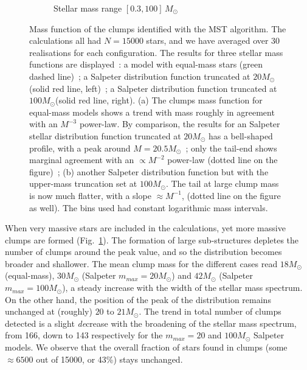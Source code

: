 \begin{figure}
\begin{subfigure}[b]{0.49\textwidth}
        \caption{Stellar mass range $[0.3, 100]\, M_\odot$}
        \label{Fig:2_ClumpMF_MF_2}
    \end{subfigure}
\caption{Mass function of the clumps identified with the MST algorithm. The calculations all had $N = 15 000$ stars, and we have averaged over 30 realisations for each configuration.  The results for three stellar mass functions  are displayed~: a model with equal-mass stars (green dashed line)~; a Salpeter distribution function truncated at $20 M_\odot$ (solid red line, left)~; a Salpeter distribution function truncated at $100 M_\odot$(solid red line, right). (a) The clumps  mass function for equal-mass models  shows a trend with mass roughly in agreement with an $M^{-3}$ power-law. By comparison,  the results for an  Salpeter stellar distribution function  truncated at $20 M_\odot$ has a bell-shaped profile, with a peak around $M = 20.5 M_{\odot}$~; only the tail-end shows marginal agreement with an $\propto M^{-2}$ power-law (dotted line on the figure)~; (b) another Salpeter distribution function but with  the upper-mass truncation  set at $100 M_\odot$. The tail at large clump mass is now much flatter, with a slope $\approx M^{-1}$, (dotted line on the figure as well). The bins used  had constant logarithmic mass intervals.}
\label{Fig:2_ClumpMF_MF}
\end{figure}



When very massive stars are included in the calculations, yet more massive clumps are formed (Fig.~\ref{Fig:2_ClumpMF_MF_2}). The formation of large sub-structures depletes the number of clumps around the peak value, and so the distribution becomes broader and shallower. The mean clump mass for the different cases read $18 M_\odot$ (equal-mass), $30 M_\odot$ (Salpeter $m_{max} = 20 M_\odot$) and $42 M_\odot$ (Salpeter $m_{max} = 100 M_\odot$), a steady increase with the width of the stellar mass spectrum. On the other hand, the position of the peak of the distribution remains unchanged at (roughly) $20$ to $21M_\odot$. The trend in total number of clumps detected is a slight {\it de}crease with the broadening of the  stellar mass spectrum, from 166, down to 143 respectively for the $m_{max}=20$ and $100 M_\odot$ Salpeter models.  
  We observe that the overall fraction of  stars found in clumps (some $\approx 6500$ out of 15000, or 43\%) stays unchanged.
  
